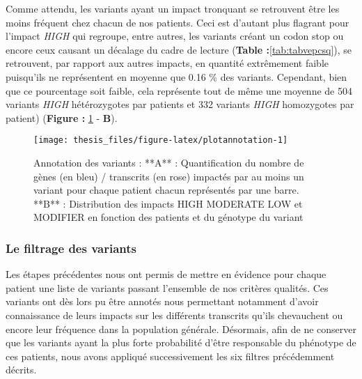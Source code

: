 \documentclass[12pt,twoside]{reedthesis}
\theoremstyle{definition}
\theoremstyle{definition}
\theoremstyle{remark}
\begin{document}
  Comme attendu, les variants ayant un impact tronquant se retrouvent être
  les moins fréquent chez chacun de nos patients. Ceci est d'autant plus
  flagrant pour l'impact \emph{HIGH} qui regroupe, entre autres, les
  variants créant un codon stop ou encore ceux causant un décalage du
  cadre de lecture (\textbf{Table :}\ref{tab:tabvepcsq}), se retrouvent,
  par rapport aux autres impacts, en quantité extrêmement faible
  puisqu'ils ne représentent en moyenne que 0.16 \% des variants.
  Cependant, bien que ce pourcentage soit faible, cela représente tout de
  même une moyenne de 504 variants \emph{HIGH} hétérozygotes par patients
  et 332 variants \emph{HIGH} homozygotes par patient) (\textbf{Figure :
  }\ref{fig:plotannotation} - \textbf{B}).
  
  \newpage
  
  \begin{figure}
  
  {\centering \texttt{[image: thesis\_files/figure-latex/plotannotation-1]} 
  
  }
  
  \caption[Annotation des variants]{Annotation des variants : **A** : Quantification du nombre de gènes (en bleu) / transcrits (en rose) impactés par au moins un variant pour chaque patient chacun représentés par une barre. **B** : Distribution des impacts HIGH MODERATE LOW et MODIFIER en fonction des patients et du génotype du variant}\label{fig:plotannotation}
  \end{figure}
  
  \subsubsection{Le filtrage des
  variants}\label{le-filtrage-des-variants-1}
  
  Les étapes précédentes nous ont permis de mettre en évidence pour chaque
  patient une liste de variants passant l'ensemble de nos critères
  qualités. Ces variants ont dès lors pu être annotés nous permettant
  notamment d'avoir connaissance de leurs impacts sur les différents
  transcrits qu'ils chevauchent ou encore leur fréquence dans la
  population générale. Désormais, afin de ne conserver que les variants
  ayant la plus forte probabilité d'être responsable du phénotype de ces
  patients, nous avons appliqué successivement les six filtres
  précédemment décrits.
  
\end{document}
